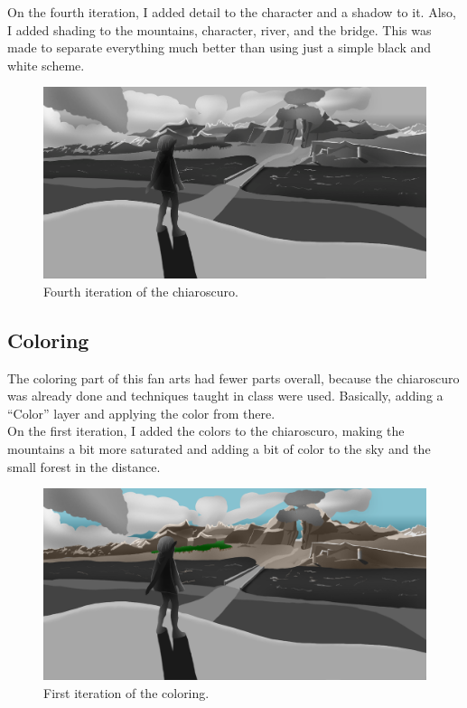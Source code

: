 \documentclass{cup-pan}
\begin{document}
        On the fourth iteration, I added detail to the character and a shadow to it. Also, I added shading to the mountains, character, river, and the bridge. This was made to separate everything much better than using just a simple black and white scheme.\\
        \begin{figure}[H]
            \includegraphics[width=\textwidth]{Imagenes/Fanart1/Claroscuro/Imagen4.png}
            \caption{Fourth iteration of the chiaroscuro.}
        \end{figure}

    \subsection{Coloring}
        The coloring part of this fan arts had fewer parts overall, because the chiaroscuro was already done and techniques taught in class were used. Basically, adding a “Color” layer and applying the color from there.\\

        On the first iteration, I added the colors to the chiaroscuro, making the mountains a bit more saturated and adding a bit of color  to the sky and the small forest in the distance.\\
        \begin{figure}[H]
            \includegraphics[width=\textwidth]{Imagenes/Fanart1/Color/I_Iteracion.png}
            \caption{First iteration of the coloring.}
        \end{figure}
        
\end{document}
